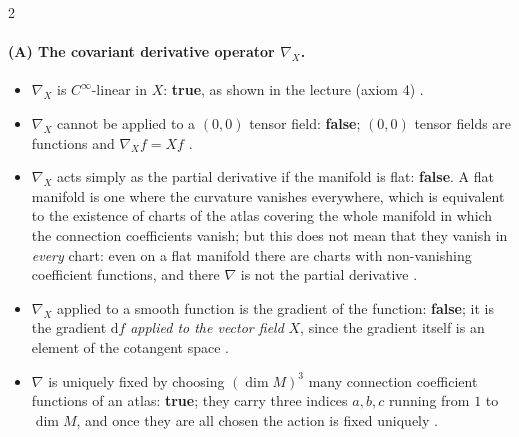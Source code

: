 \begin{paracol}{2}
\paragraph{(A) The covariant derivative operator $\nabla_X$.}
\begin{itemize}
  \item $\nabla_X$ is $C^\infty$-linear in $X$: \textbf{true}, as shown in the lecture (axiom 4) .
  \item $\nabla_X$ cannot be applied to a $(0,0)$ tensor field: \textbf{false}; $(0,0)$ tensor fields are functions and $\nabla_Xf=Xf$ .
  \item $\nabla_X$ acts simply as the partial derivative if the manifold is flat: \textbf{false}. A flat manifold is one where the curvature vanishes everywhere, which is equivalent to the existence of charts of the atlas covering the whole manifold in which the connection coefficients vanish; but this does not mean that they vanish in \emph{every} chart: even on a flat manifold there are charts with non-vanishing coefficient functions, and there $\nabla$ is not the partial derivative .
  \item $\nabla_X$ applied to a smooth function is the gradient of the function: \textbf{false}; it is the gradient $\mathrm df$ \emph{applied to the vector field} $X$, since the gradient itself is an element of the cotangent space .
  \item $\nabla$ is uniquely fixed by choosing $(\dim M)^3$ many connection coefficient functions of an atlas: \textbf{true}; they carry three indices $a,b,c$ running from $1$ to $\dim M$, and once they are all chosen the action is fixed uniquely .
\end{itemize}


\end{paracol}
